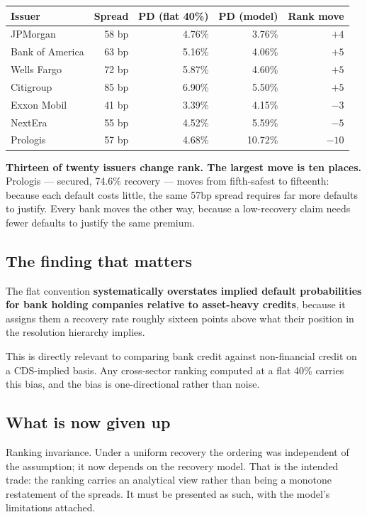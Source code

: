 \documentclass[11pt,a4paper]{article}
\newcommand{\keypoint}[1]{\par\vspace{0.4em}\noindent
  \colorbox{codebg}{\parbox{\dimexpr\linewidth-2\fboxsep}{\small #1}}\par\vspace{0.5em}}
\begin{document}
\begin{center}
\begin{tabular}{lrrrr}
\toprule
\textbf{Issuer} & \textbf{Spread} & \textbf{PD (flat 40\%)} & \textbf{PD (model)} & \textbf{Rank move} \\
\midrule
JPMorgan & 58 bp & 4.76\% & 3.76\% & $+4$ \\
Bank of America & 63 bp & 5.16\% & 4.06\% & $+5$ \\
Wells Fargo & 72 bp & 5.87\% & 4.60\% & $+5$ \\
Citigroup & 85 bp & 6.90\% & 5.50\% & $+5$ \\
Exxon Mobil & 41 bp & 3.39\% & 4.15\% & $-3$ \\
NextEra & 55 bp & 4.52\% & 5.59\% & $-5$ \\
Prologis & 57 bp & 4.68\% & 10.72\% & $-10$ \\
\bottomrule
\end{tabular}
\end{center}

\keypoint{\textbf{Thirteen of twenty issuers change rank. The largest move is ten
places.} Prologis --- secured, 74.6\% recovery --- moves from fifth-safest to
fifteenth: because each default costs little, the same 57bp spread requires far more
defaults to justify. Every bank moves the other way, because a low-recovery claim needs
fewer defaults to justify the same premium.}

\subsection{The finding that matters}

The flat convention \textbf{systematically overstates implied default probabilities for
bank holding companies relative to asset-heavy credits}, because it assigns them a
recovery rate roughly sixteen points above what their position in the resolution
hierarchy implies.

This is directly relevant to comparing bank credit against non-financial credit on a
CDS-implied basis. Any cross-sector ranking computed at a flat 40\% carries this bias,
and the bias is one-directional rather than noise.

\subsection{What is now given up}

Ranking invariance. Under a uniform recovery the ordering was independent of the
assumption; it now depends on the recovery model. That is the intended trade: the
ranking carries an analytical view rather than being a monotone restatement of the
spreads. It must be presented as such, with the model's limitations attached.
\end{document}
